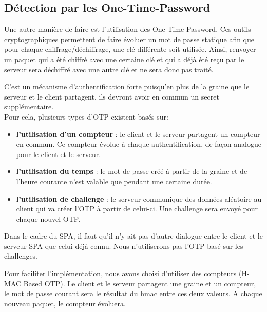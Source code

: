 \subsection{Détection par les \textbf{O}ne-\textbf{T}ime-\textbf{P}assword}

Une autre manière de faire est l'utilisation des One-Time-Password. Ces outils cryptographiques permettent de faire évoluer un mot de passe statique afin que pour chaque chiffrage/déchiffrage, une clé différente soit utilisée. Ainsi, renvoyer un paquet qui a été chiffré avec une certaine clé et qui a déjà été reçu par le serveur sera déchiffré avec une autre clé et ne sera donc pas traité.

C'est un mécanisme d'authentification forte puisqu'en plus de la graine que le serveur et le client partagent, ils devront avoir en commun un secret supplémentaire.\\

Pour cela, plusieurs types d'OTP existent basés sur:

\begin{itemize}

\item \textbf{l'utilisation d'un compteur} : le client et le serveur partagent un compteur en commun. Ce compteur évolue à chaque authentification, de façon analogue pour le client et le serveur.

\item \textbf{l'utilisation du temps} : le mot de passe créé à partir de la graine et de l'heure courante n'est valable que pendant une certaine durée.

\item \textbf{l'utilisation de challenge} : le serveur communique des données aléatoire au client qui va créer l'OTP à partir de celui-ci. Une challenge sera envoyé pour chaque nouvel OTP.

\end{itemize}

\vspace{0.5cm}

Dans le cadre du SPA, il faut qu'il n'y ait pas d'autre dialogue entre le client et le serveur SPA que celui déjà connu. Nous n'utiliserons pas l'OTP basé sur les challenges.

Pour faciliter l'implémentation, nous avons choisi d'utiliser des compteurs (H-MAC Based OTP). Le client et le serveur partagent une graine et un compteur, le mot de passe courant sera le résultat du hmac entre ces deux valeurs. A chaque nouveau paquet, le compteur évoluera. 

